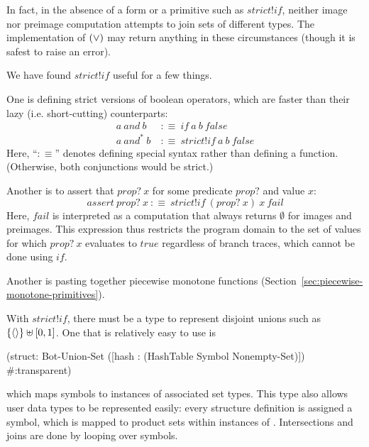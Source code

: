 In fact, in the absence of a form or a primitive such as $strict!if$, neither image nor preimage computation attempts to join sets of different types.
The implementation of $(\vee)$ may return anything in these circumstances (though it is safest to raise an error).

We have found $strict!if$ useful for a few things.

One is defining strict versions of boolean operators, which are faster than their lazy (i.e. short-cutting) counterparts:
\begin{equation}
\begin{aligned}
	a~and~b&\ :\equiv\ if~a~b~false \\
	a~and^*~b&\ :\equiv\ strict!if~a~b~false
\end{aligned}
\end{equation}
Here, ``$:\equiv$'' denotes defining special syntax rather than defining a function.
(Otherwise, both conjunctions would be strict.)

Another is to assert that $prop?~x$ for some predicate $prop?$ and value $x$:
\begin{equation}
	assert~prop?~x\ :\equiv\ strict!if~(prop?~x)~x~fail
\end{equation}
Here, $fail$ is interpreted as a computation that always returns $\emptyset$ for images and preimages.
This expression thus restricts the program domain to the set of values for which $prop?~x$ evaluates to $true$ regardless of branch traces, which cannot be done using $if$.

Another is pasting together piecewise monotone functions (Section~\ref{sec:piecewise-monotone-primitives}).

With $strict!if$, there must be a type to represent disjoint unions such as $\{{\langle{}\rangle}\} \uplus [0,1]$.
One that is relatively easy to use is
\begin{center}\singlespacing
\begin{schemedisplay}
(struct: Bot-Union-Set ([hash : (HashTable Symbol Nonempty-Set)])
  #:transparent)
\end{schemedisplay}
\end{center}
which maps symbols to instances of associated set types.
This type also allows user data types to be represented easily: every structure definition is assigned a symbol, which is mapped to product sets within instances of .
Intersections and joins are done by looping over symbols.


